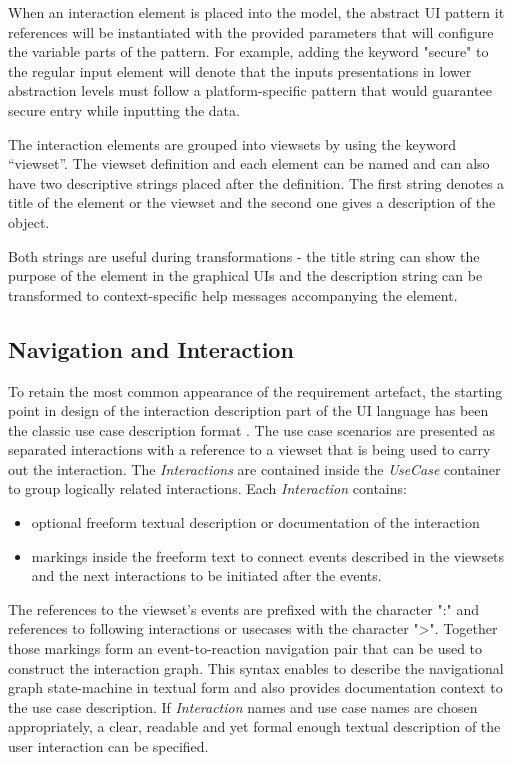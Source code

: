 \documentclass[conference]{IEEEtran}
\begin{document}
When an interaction element is placed into the model, the abstract UI pattern
it references will be instantiated with the provided parameters that will
configure the variable parts of the pattern.  For example, adding the keyword
"secure" to the regular input element will denote that the inputs presentations
in lower abstraction levels must follow a platform-specific pattern that would
guarantee secure entry while inputting the data.

The interaction elements are grouped into viewsets by using the keyword
“viewset”.  The viewset definition and each element can be named and can also
have two descriptive strings placed after the definition.  The first string
denotes a title of the element or the viewset and the second one gives a
description of the object.

Both strings are useful during transformations - the title string can show the
purpose of the element in the graphical UIs and the description string can be
transformed to context-specific help messages accompanying the element.

\subsection{Navigation and Interaction}

To retain the most common appearance of the requirement artefact, the starting
point in design of the interaction description part of the UI language has been
the classic use case description format \cite{Cockburn10template}.  The use
case scenarios are presented as separated interactions with a reference to a
viewset that is being used to carry out the interaction.  The
\textit{Interactions} are contained inside the \textit{UseCase} container to
group logically related interactions.  Each \textit{Interaction} contains:

\begin{itemize}
  \item optional freeform textual description or documentation of the
    interaction
  \item markings inside the freeform text to connect events described in the
    viewsets and the next interactions to be initiated after the events.
\end{itemize}

The references to the viewset's events are prefixed with the character ":" and
references to following interactions or usecases with the character
"\textgreater".  Together those markings form an event-to-reaction navigation
pair that can be used to construct the interaction graph.  This syntax enables
to describe the navigational graph state-machine in textual form and also
provides documentation context to the use case description.  If
\textit{Interaction} names and use case names are chosen appropriately, a
clear, readable and yet formal enough textual description of the user
interaction can be specified.
\end{document}
